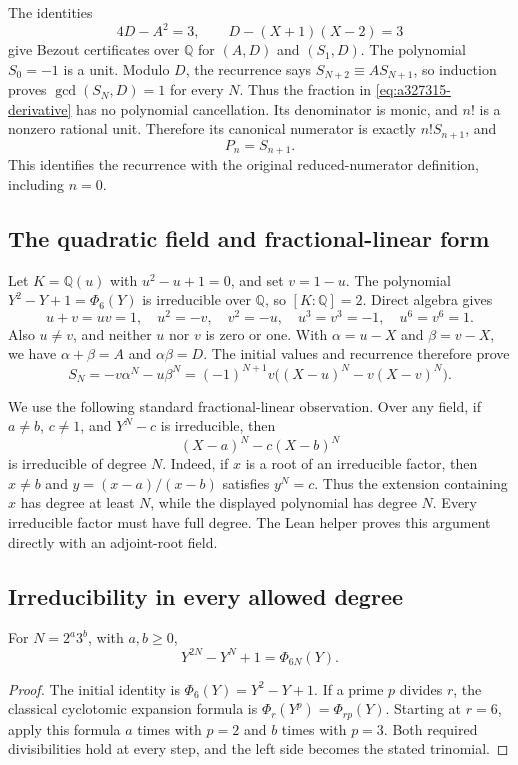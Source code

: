 The identities
\[
 4D-A^2=3,\qquad D-(X+1)(X-2)=3
\]
give Bezout certificates over $\mathbb Q$ for $(A,D)$ and $(S_1,D)$.
The polynomial $S_0=-1$ is a unit.  Modulo $D$, the recurrence says
$S_{N+2}\equiv A S_{N+1}$, so induction proves
$\gcd(S_N,D)=1$ for every $N$.  Thus the fraction in
\eqref{eq:a327315-derivative} has no polynomial cancellation.  Its
denominator is monic, and $n!$ is a nonzero rational unit.  Therefore its
canonical numerator is exactly $n!S_{n+1}$, and
\begin{equation}
\label{eq:a327315-source}
 P_n=S_{n+1}.
\end{equation}
This identifies the recurrence with the original reduced-numerator
definition, including $n=0$.

\subsection{The quadratic field and fractional-linear form}

Let $K=\mathbb Q(u)$ with $u^2-u+1=0$, and set $v=1-u$.
The polynomial $Y^2-Y+1=\Phi_6(Y)$ is irreducible over $\mathbb Q$, so
$[K:\mathbb Q]=2$.  Direct algebra gives
\[
 u+v=uv=1,\quad u^2=-v,\quad v^2=-u,\quad
 u^3=v^3=-1,\quad u^6=v^6=1.
\]
Also $u\ne v$, and neither $u$ nor $v$ is zero or one.
With $\alpha=u-X$ and $\beta=v-X$, we have
$\alpha+\beta=A$ and $\alpha\beta=D$.  The initial values and
recurrence therefore prove
\begin{equation}
\label{eq:a327315-closed}
 S_N=-v\alpha^N-u\beta^N
 =(-1)^{N+1}v\big((X-u)^N-v(X-v)^N\big).
\end{equation}

We use the following standard fractional-linear observation.  Over any
field, if $a\ne b$, $c\ne1$, and $Y^N-c$ is irreducible, then
\[
 (X-a)^N-c(X-b)^N
\]
is irreducible of degree $N$.  Indeed, if $x$ is a root of an irreducible
factor, then $x\ne b$ and
$y=(x-a)/(x-b)$ satisfies $y^N=c$.  Thus the extension containing $x$
has degree at least $N$, while the displayed polynomial has degree $N$.
Every irreducible factor must have full degree.  The Lean helper proves
this argument directly with an adjoint-root field.

\subsection{Irreducibility in every allowed degree}

\begin{lemma}
\label{lem:a327315-cyclotomic}
For $N=2^a3^b$, with $a,b\ge0$,
\[
 Y^{2N}-Y^N+1=\Phi_{6N}(Y).
\]
\end{lemma}
\begin{proof}
The initial identity is $\Phi_6(Y)=Y^2-Y+1$.  If a prime $p$ divides
$r$, the classical cyclotomic expansion formula is
$\Phi_r(Y^p)=\Phi_{rp}(Y)$.  Starting at $r=6$, apply this formula
$a$ times with $p=2$ and $b$ times with $p=3$.  Both required divisibilities
hold at every step, and the left side becomes the stated trinomial.
\end{proof}

